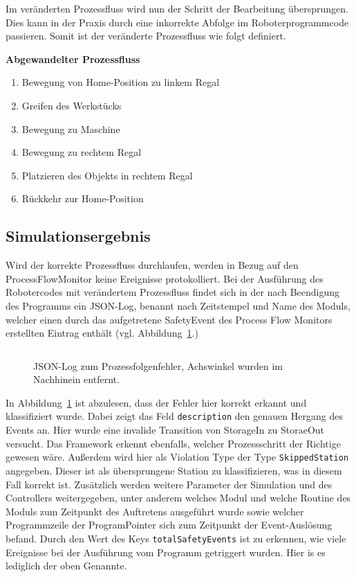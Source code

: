 Im veränderten Prozessfluss wird nun der Schritt der Bearbeitung übersprungen.
Dies kann in der Praxis durch eine inkorrekte Abfolge im Roboterprogrammcode
passieren. Somit ist der veränderte Prozessfluss wie folgt definiert.

\noindent
\textbf{Abgewandelter Prozessfluss}
\begin{enumerate}
  \item Bewegung von Home-Position zu linkem Regal
  \item Greifen des Werkstücks
  \item Bewegung zu Maschine
  \item Bewegung zu rechtem Regal
  \item Platzieren des Objekts in rechtem Regal
  \item Rückkehr zur Home-Position
\end{enumerate}

\subsection{Simulationsergebnis}
Wird der korrekte Prozessfluss durchlaufen, werden in Bezug auf den
ProcessFlowMonitor keine Ereignisse protokolliert.
Bei der Ausführung des Robotercodes mit verändertem Prozessfluss findet sich in
der nach Beendigung des Programms ein JSON-Log, benannt nach
Zeitstempel und Name des Moduls,
welcher einen durch das aufgetretene SafetyEvent des Process Flow Monitors
erstellten Eintrag enthält (vgl. Abbildung~\ref{listing:processflowerror}.)

\begin{figure}[H]
  \inputminted[fontsize=\footnotesize]{json}{code-snippets/processflowerror.json}
  \caption{JSON-Log zum Prozessfolgenfehler, Achswinkel wurden im Nachhinein
  entfernt.}
  \label{listing:processflowerror}
\end{figure}

In Abbildung~\ref{listing:processflowerror} ist abzulesen, dass der
Fehler hier korrekt erkannt und klassifiziert wurde. Dabei zeigt das Feld
\texttt{description} den genauen Hergang des Events an. Hier wurde eine invalide
Transition von StorageIn zu StoraeOut versucht. Das Framework erkennt
ebenfalls, welcher Prozessschritt der Richtige gewesen wäre. Außerdem wird hier
als Violation Type der Type \texttt{SkippedStation} angegeben. Dieser ist als
übersprungene Station zu klassifizieren, was in diesem Fall korrekt ist.
Zusätzlich werden weitere Parameter der Simulation und des Controllers
weitergegeben, unter anderem welches Modul und welche Routine des Moduls zum
Zeitpunkt des Auftretens ausgeführt wurde sowie welcher Programmzeile der
ProgramPointer sich zum Zeitpunkt der Event-Auslösung befand. Durch den Wert des
Keys \texttt{totalSafetyEvents} ist zu erkennen, wie viele Ereignisse bei der
Ausführung vom Programm getriggert wurden. Hier is es lediglich der oben
Genannte.

